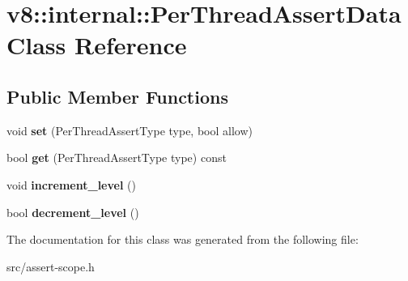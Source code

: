 \hypertarget{classv8_1_1internal_1_1_per_thread_assert_data}{}\section{v8\+:\+:internal\+:\+:Per\+Thread\+Assert\+Data Class Reference}
\label{classv8_1_1internal_1_1_per_thread_assert_data}
\subsection*{Public Member Functions}
\begin{DoxyCompactItemize}
\item 
\hypertarget{classv8_1_1internal_1_1_per_thread_assert_data_a736bcfd84c488f7f5aed5659dcb929a7}{}void {\bfseries set} (Per\+Thread\+Assert\+Type type, bool allow)\label{classv8_1_1internal_1_1_per_thread_assert_data_a736bcfd84c488f7f5aed5659dcb929a7}

\item 
\hypertarget{classv8_1_1internal_1_1_per_thread_assert_data_a0cb5478248fc9a8e206cd1bcd5cb4df5}{}bool {\bfseries get} (Per\+Thread\+Assert\+Type type) const \label{classv8_1_1internal_1_1_per_thread_assert_data_a0cb5478248fc9a8e206cd1bcd5cb4df5}

\item 
\hypertarget{classv8_1_1internal_1_1_per_thread_assert_data_a8feb5c9e099170a168542f0ab6b19279}{}void {\bfseries increment\+\_\+level} ()\label{classv8_1_1internal_1_1_per_thread_assert_data_a8feb5c9e099170a168542f0ab6b19279}

\item 
\hypertarget{classv8_1_1internal_1_1_per_thread_assert_data_a765a167d5dbc9066f407a145b1330ee9}{}bool {\bfseries decrement\+\_\+level} ()\label{classv8_1_1internal_1_1_per_thread_assert_data_a765a167d5dbc9066f407a145b1330ee9}

\end{DoxyCompactItemize}


The documentation for this class was generated from the following file\+:\begin{DoxyCompactItemize}
\item 
src/assert-\/scope.\+h\end{DoxyCompactItemize}
